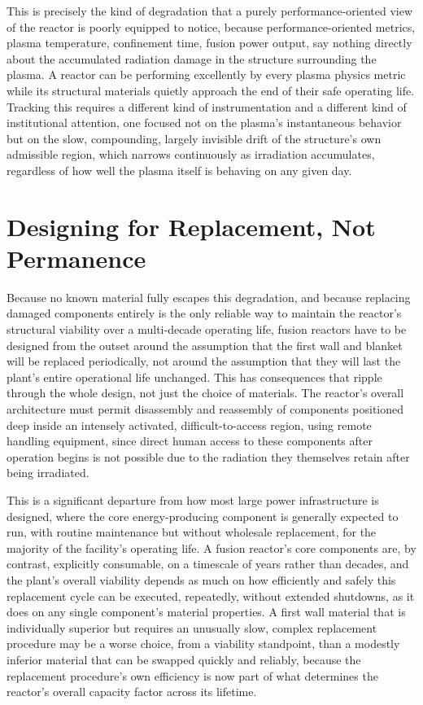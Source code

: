 This is precisely the kind of degradation that a purely performance-oriented view of the reactor is poorly equipped to notice, because performance-oriented metrics, plasma temperature, confinement time, fusion power output, say nothing directly about the accumulated radiation damage in the structure surrounding the plasma. A reactor can be performing excellently by every plasma physics metric while its structural materials quietly approach the end of their safe operating life. Tracking this requires a different kind of instrumentation and a different kind of institutional attention, one focused not on the plasma's instantaneous behavior but on the slow, compounding, largely invisible drift of the structure's own admissible region, which narrows continuously as irradiation accumulates, regardless of how well the plasma itself is behaving on any given day.

\section{Designing for Replacement, Not Permanence}

Because no known material fully escapes this degradation, and because replacing damaged components entirely is the only reliable way to maintain the reactor's structural viability over a multi-decade operating life, fusion reactors have to be designed from the outset around the assumption that the first wall and blanket will be replaced periodically, not around the assumption that they will last the plant's entire operational life unchanged. This has consequences that ripple through the whole design, not just the choice of materials. The reactor's overall architecture must permit disassembly and reassembly of components positioned deep inside an intensely activated, difficult-to-access region, using remote handling equipment, since direct human access to these components after operation begins is not possible due to the radiation they themselves retain after being irradiated.

This is a significant departure from how most large power infrastructure is designed, where the core energy-producing component is generally expected to run, with routine maintenance but without wholesale replacement, for the majority of the facility's operating life. A fusion reactor's core components are, by contrast, explicitly consumable, on a timescale of years rather than decades, and the plant's overall viability depends as much on how efficiently and safely this replacement cycle can be executed, repeatedly, without extended shutdowns, as it does on any single component's material properties. A first wall material that is individually superior but requires an unusually slow, complex replacement procedure may be a worse choice, from a viability standpoint, than a modestly inferior material that can be swapped quickly and reliably, because the replacement procedure's own efficiency is now part of what determines the reactor's overall capacity factor across its lifetime.

